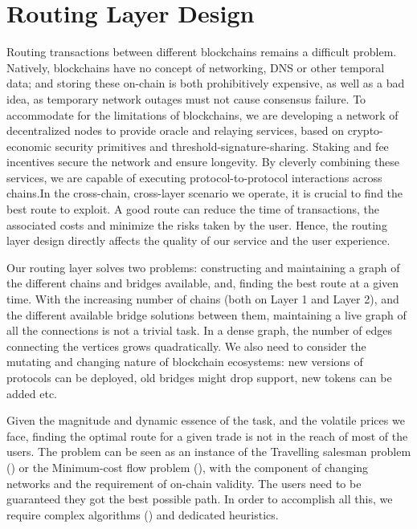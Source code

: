 \section{Routing Layer Design}
Routing transactions between different blockchains remains a difficult problem. Natively, blockchains have no concept of networking, DNS or other temporal data; and storing these on-chain is both prohibitively expensive, as well as a bad idea, as temporary network outages must not cause consensus failure. To accommodate for the limitations of blockchains, we are developing a network of decentralized nodes to provide oracle and relaying services, based on crypto-economic security primitives and threshold-signature-sharing. Staking and fee incentives secure the network and ensure longevity. By cleverly combining these services, we are capable of executing protocol-to-protocol interactions across chains.In the cross-chain, cross-layer scenario we operate, it is crucial to find the best route to exploit. A good route can reduce the time of transactions, the associated costs and minimize the risks taken by the user. Hence, the routing layer design directly affects the quality of our service and the user experience. 

Our routing layer solves two problems: constructing and maintaining a graph of the different chains and bridges available, and, finding the best route at a given time. With the increasing number of chains (both on Layer 1 and Layer 2), and the different available bridge solutions between them, maintaining a live graph of all the connections is not a trivial task. In a dense graph, the number of edges connecting the vertices grows quadratically. We also need to consider the mutating and changing nature of blockchain ecosystems: new versions of protocols can be deployed, old bridges might drop support, new tokens can be added etc. 

Given the magnitude and dynamic essence of the task, and the volatile prices we face, finding the optimal route for a given trade is not in the reach of most of the users. The problem can be seen as an instance of the Travelling salesman problem () or the Minimum-cost flow problem (), with the component of changing networks and the requirement of on-chain validity. The users need to be guaranteed they got the best possible path. In order to accomplish all this, we require complex algorithms () and dedicated heuristics.

